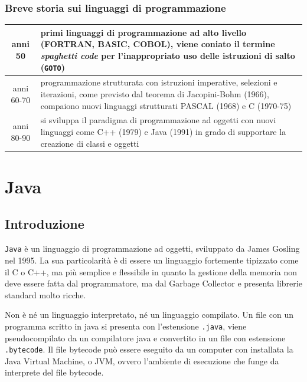 \documentclass[a4paper]{article}
\begin{document}
\subsubsection*{Breve storia sui linguaggi di programmazione}
\begin{center}
	\begin{tabularx}{\textwidth}{c X}
		anni 50
		& primi linguaggi di programmazione ad alto livello (FORTRAN, BASIC, COBOL), viene coniato il
		termine \textit{spaghetti code} per l'inappropriato uso delle istruzioni di salto (\verb|GOTO|) \\
		\midrule
		
		anni 60-70
		& programmazione strutturata con istruzioni imperative, selezioni e iterazioni, come previsto dal teorema di
		Jacopini-Bohm (1966), compaiono nuovi linguaggi strutturati PASCAL (1968) e C (1970-75) \\
		\midrule

		anni 80-90
		& si sviluppa il paradigma di programmazione ad oggetti con nuovi linguaggi come C++ (1979) e Java
		(1991) in grado di supportare la creazione di classi e oggetti
	\end{tabularx}
\end{center}


\section{Java}
\subsection{Introduzione}
\verb|Java| è un linguaggio di programmazione ad oggetti, sviluppato da James Gosling nel 1995. La sua particolarità è di
essere un linguaggio fortemente tipizzato come il C o C++, ma più semplice e flessibile in quanto la gestione
della memoria non deve essere fatta dal programmatore, ma dal Garbage Collector e presenta librerie standard molto ricche.

Non è né un linguaggio interpretato, né un linguaggio compilato. Un file con un programma scritto in java si presenta con
l'estensione \verb|.java|, viene pseudocompilato da un compilatore java e convertito in un file con estensione \verb|.bytecode|.
Il file bytecode può essere eseguito da un computer con installata la Java Virtual Machine, o JVM, ovvero l'ambiente di
esecuzione che funge da interprete del file bytecode.
\end{document}
